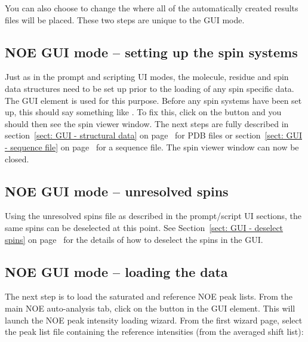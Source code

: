 You can also choose to change the  where all of the automatically created results files will be placed.
These two steps are unique to the GUI mode.



\subsection{NOE GUI mode -- setting up the spin systems}

Just as in the prompt and scripting UI modes, the molecule, residue and spin data structures need to be set up prior to the loading of any spin specific data.
The  GUI element is used for this purpose.
Before any spin systems have been set up, this should say something like .
To fix this, click on the  button and you should then see the spin viewer window.
The next steps are fully described in section~\ref{sect: GUI - structural data} on page~\pageref{sect: GUI - structural data} for PDB files or section~\ref{sect: GUI - sequence file} on page~\pageref{sect: GUI - sequence file} for a sequence file.
The spin viewer window can now be closed.



\subsection{NOE GUI mode -- unresolved spins}

Using the unresolved spins file as described in the prompt/script UI sections, the same spins can be deselected at this point.
See Section~\ref{sect: GUI - deselect spins} on page~\pageref{sect: GUI - deselect spins} for the details of how to deselect the spins in the GUI.



\subsection{NOE GUI mode -- loading the data}

The next step is to load the saturated and reference NOE peak lists.
From the main NOE auto-analysis tab, click on the  button in the  GUI element.
This will launch the NOE peak intensity loading wizard.
From the first wizard page, select the peak list file containing the reference intensities (from the averaged shift list):

